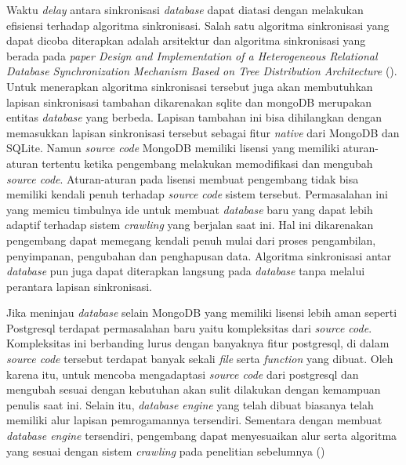 Waktu \emph{delay} antara sinkronisasi \emph{database} dapat diatasi dengan melakukan efisiensi terhadap 
algoritma sinkronisasi. Salah satu algoritma sinkronisasi yang dapat dicoba diterapkan adalah arsitektur dan algoritma sinkronisasi yang berada pada
\emph{paper Design and Implementation of a Heterogeneous Relational Database Synchronization Mechanism Based on Tree Distribution Architecture} (\cite{Xu2019}). 
Untuk menerapkan algoritma sinkronisasi tersebut juga akan membutuhkan lapisan sinkronisasi tambahan dikarenakan sqlite dan mongoDB merupakan entitas \emph{database}
yang berbeda. Lapisan tambahan ini bisa dihilangkan dengan memasukkan lapisan sinkronisasi tersebut sebagai fitur \emph{native} dari MongoDB dan SQLite.
Namun \emph{source code} MongoDB memiliki lisensi yang memiliki aturan-aturan tertentu ketika pengembang melakukan memodifikasi dan mengubah \emph{source code}.
Aturan-aturan pada lisensi membuat pengembang tidak bisa memiliki kendali penuh terhadap \emph{source code} sistem tersebut. Permasalahan ini yang memicu timbulnya ide untuk membuat \emph{database} baru yang dapat lebih 
adaptif terhadap sistem \emph{crawling} yang berjalan saat ini. Hal ini dikarenakan pengembang dapat memegang kendali penuh mulai dari proses pengambilan, penyimpanan,
pengubahan dan penghapusan data. Algoritma sinkronisasi antar \emph{database} pun juga dapat diterapkan langsung pada \emph{database} tanpa melalui perantara lapisan sinkronisasi.

Jika meninjau \emph{database} selain MongoDB yang memiliki lisensi lebih aman seperti Postgresql terdapat permasalahan baru yaitu kompleksitas dari \emph{source code}. Kompleksitas ini
berbanding lurus dengan banyaknya fitur postgresql, di dalam \emph{source code} tersebut terdapat banyak sekali \emph{file} serta \emph{function} yang dibuat. Oleh karena itu, untuk mencoba
mengadaptasi \emph{source code} dari postgresql dan mengubah sesuai dengan kebutuhan akan sulit dilakukan dengan kemampuan penulis saat ini. Selain itu, \emph{database engine} yang telah dibuat
biasanya telah memiliki alur lapisan pemrogamannya tersendiri. Sementara dengan membuat \emph{database engine} tersendiri, pengembang dapat menyesuaikan alur serta algoritma
yang sesuai dengan sistem \emph{crawling} pada penelitian sebelumnya (\cite{ridho2024})

